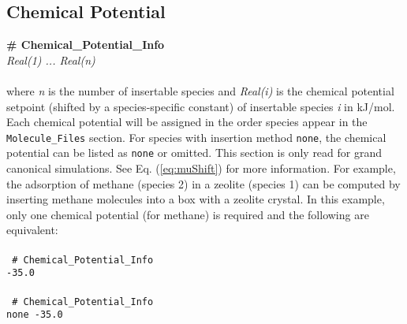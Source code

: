 \subsection{Chemical Potential}\label{sec:Chemical_Potential}
{\bf \# Chemical\_Potential\_Info} \\
{\it Real(1) ... Real(n)} \\ \\
%
where {\it n} is the number of insertable species and {\it Real(i)} is the
chemical potential setpoint (shifted by a species-specific constant) of
insertable species {\it i} in kJ/mol. Each chemical potential will be assigned
in the order species appear in the \texttt{Molecule\_Files} section.
For species with insertion method {\tt none},
the chemical potential can be listed as {\tt none} or omitted.
This section is only read for grand canonical simulations.
See Eq. (\ref{eq:muShift}) for more information.
For example, the adsorption of methane (species 2) in a zeolite (species 1)
can be computed by inserting methane molecules into a box with a zeolite crystal.
In this example, only one chemical potential (for methane) is required
and the following are equivalent: \\ \\
%
\texttt{
\# Chemical\_Potential\_Info \\
 -35.0} \\ \\
%
\texttt{
\# Chemical\_Potential\_Info \\
 none -35.0} \\ \\
%
%
%
%
%
